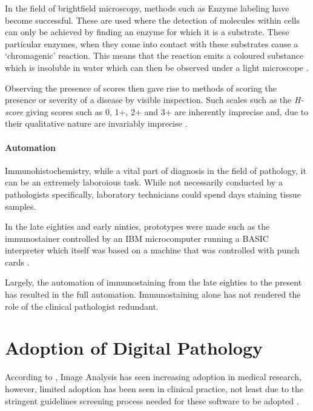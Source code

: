 \documentclass[12pt]{article}
\begin{document}
In the field of brightfield microscopy, methods such as Enzyme labeling have become successful. These are used where 
the detection of molecules within cells can only be achieved by finding an enzyme for which it is a substrate. These 
particular enzymes, when they come into contact with these substrates cause a `chromagenic' reaction. This means 
that the reaction emits a coloured substance which is insoluble in water which can then be observed under a light microscope 
\parencite[Ch.~2]{buchwalow2010immunohistochemistry} .

Observing the presence of scores then gave rise to methods of scoring the presence or severity of a disease by visible 
inspection. Such scales such as the \emph{H-score} giving scores such as 0, 1+, 2+ and 3+ are inherently imprecise and, 
due to their qualitative nature are invariably imprecise \parencite[Ch.~23]{dabbs2013diagnostic}.

\paragraph{Automation}

Immunohistochemistry, while a vital part of diagnosis in the field of pathology, it can be an extremely laboroious 
task. While not necessarily conducted by a pathologists specifically, laboratory technicians could spend days 
staining tissue samples.

In the late eighties and early ninties, prototypes were made such as the immunostainer controlled by an IBM 
microcomputer running a BASIC interpreter which itself was based on a machine that was controlled with punch cards 
\parencite{mawhinney1990automated}.

Largely, the automation of immunostaining from the late eighties to the present has resulted in the full automation. 
Immunostaining alone has not rendered the role of the clinical pathologist redundant.

\section{Adoption of Digital Pathology}
According to \citeauthor{dabbs2013diagnostic}, Image Analysis has seen increasing adoption in medical research, 
however, limited adoption has been seen in clinical practice, not least due to the stringent guidelines screening 
process needed for these software to be adopted \parencite[Ch.~23]{dabbs2013diagnostic}.
\end{document}
